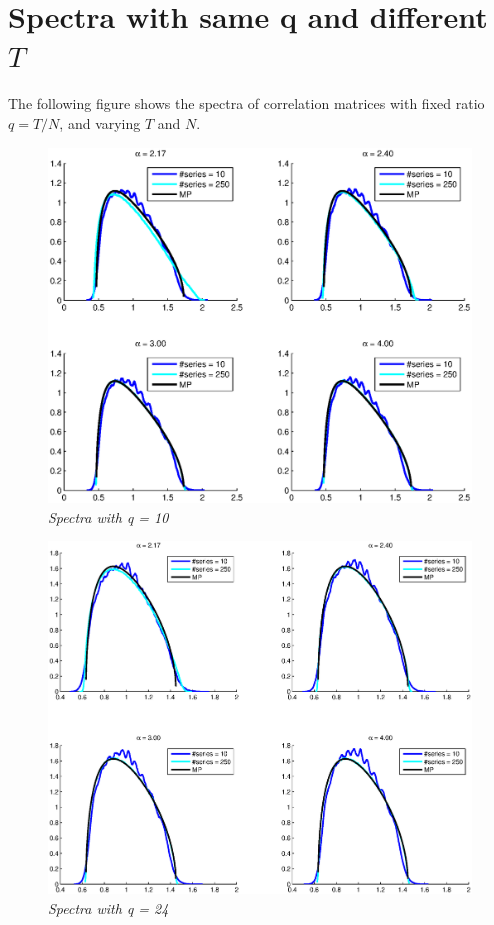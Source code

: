 \documentclass{article}
\begin{document}
\section{Spectra with same q and different $T$}
The following figure shows the spectra of correlation matrices with
fixed ratio $q = T/N$, and varying $T$ and $N$.
\begin{figure}[htb!]
  \centering
  \includegraphics[scale=0.4]{../pics/spectra_q10.eps}
  \caption{\small \it Spectra with q = 10}
\end{figure}

\begin{figure}[htb!]
  \centering
  \includegraphics[scale=0.3]{../pics/spectra_q24.eps}
  \caption{\small \it Spectra with q = 24}
\end{figure}
\end{document}
